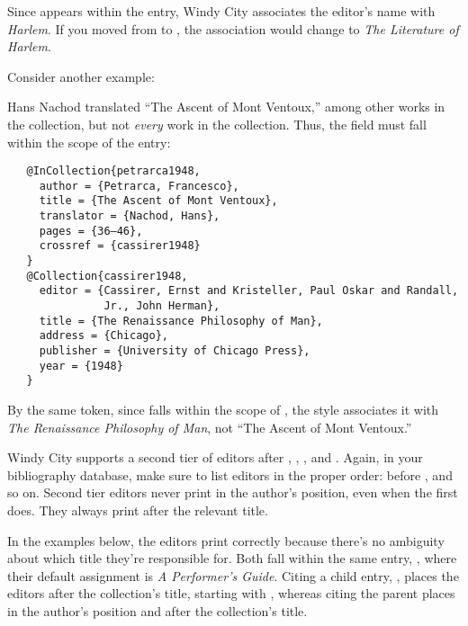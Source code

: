 \documentclass[11pt,letterpaper,oneside]{article}
\begin{document}
\noindent Since  appears within the
 entry, Windy City associates the editor's name
with \textit{Harlem}. If you moved  from
 to , the association would
change to \textit{The Literature of Harlem}.

Consider another example:

\begin{citebib}
\item \cite{petrarca1948}
\end{citebib}

\noindent Hans Nachod translated ``The Ascent of Mont Ventoux,'' among
other works in the collection, but not \textit{every} work in the
collection. Thus, the  field must fall within the
scope of the  entry:

\begin{verbatim}
   @InCollection{petrarca1948,
     author = {Petrarca, Francesco},
     title = {The Ascent of Mont Ventoux},
     translator = {Nachod, Hans},
     pages = {36–46},
     crossref = {cassirer1948}
   }
   @Collection{cassirer1948,
     editor = {Cassirer, Ernst and Kristeller, Paul Oskar and Randall,
               Jr., John Herman},
     title = {The Renaissance Philosophy of Man},
     address = {Chicago},
     publisher = {University of Chicago Press},
     year = {1948}
   }
\end{verbatim}

\noindent By the same token, since  falls within the
scope of , the style associates it with
\textit{The Renaissance Philosophy of Man}, not ``The Ascent of Mont
Ventoux.''

Windy City supports a second tier of editors after ,
, , and .
Again, in your bibliography database, make sure to list editors in the
proper order:  before , and so on.
Second tier editors never print in the author's position, even when
the first does. They always print after the relevant title.

In the examples below, the editors print correctly because there's no
ambiguity about which title they're responsible for. Both fall within
the same entry, , where their default assignment
is \textit{A Performer's Guide}. Citing a child entry,
, places the editors after the collection's title,
starting with , whereas citing the parent places
 in the author's position and 
after the collection's title.
\end{document}
